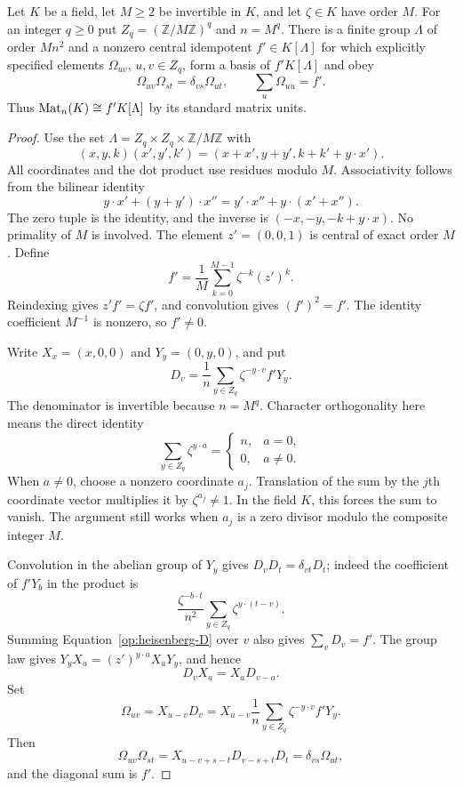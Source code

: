 \begin{proposition}\label{op:heisenberg}
Let $K$ be a field, let $M\ge2$ be invertible in $K$, and let
$\zeta\in K$ have order $M$. For an integer $q\ge0$ put
$Z_q=(\mathbb Z/M\mathbb Z)^q$ and $n=M^q$. There is a finite group
$\Lambda$ of order $Mn^2$ and a nonzero central idempotent
$f'\in K[\Lambda]$ for which explicitly specified elements
$\Omega_{uv}$, $u,v\in Z_q$, form a basis of $f'K[\Lambda]$ and obey
\[
 \Omega_{uv}\Omega_{st}=\delta_{vs}\Omega_{ut},\qquad
 \sum_u\Omega_{uu}=f'.
\]
Thus $\operatorname{Mat}_n(K)\cong f'K[\Lambda]$ by its standard matrix units.
\end{proposition}
\begin{proof}
Use the set $\Lambda=Z_q\times Z_q\times\mathbb Z/M\mathbb Z$ with
\begin{equation}\label{op:heisenberg-law}
 (x,y,k)(x',y',k')=(x+x',y+y',k+k'+y\cdot x').
\end{equation}
All coordinates and the dot product use residues modulo $M$.
Associativity follows from the bilinear identity
\[
 y\cdot x'+(y+y')\cdot x''=y'\cdot x''+y\cdot(x'+x'').
\]
The zero tuple is the identity, and the inverse is
$(-x,-y,-k+y\cdot x)$. No primality of $M$ is involved.
The element $z'=(0,0,1)$ is central of exact order $M$. Define
\[
 f'=\frac1M\sum_{k=0}^{M-1}\zeta^{-k}(z')^k.
\]
Reindexing gives $z'f'=\zeta f'$, and convolution gives $(f')^2=f'$.
The identity coefficient $M^{-1}$ is nonzero, so $f'\ne0$.

Write $X_x=(x,0,0)$ and $Y_y=(0,y,0)$, and put
\begin{equation}\label{op:heisenberg-D}
 D_v=\frac1n\sum_{y\in Z_q}\zeta^{-y\cdot v}f'Y_y.
\end{equation}
The denominator is invertible because $n=M^q$. Character orthogonality
here means the direct identity
\begin{equation}\label{op:composite-orthogonality}
 \sum_{y\in Z_q}\zeta^{y\cdot a}
 =\begin{cases}n,&a=0,\\0,&a\ne0.\end{cases}
\end{equation}
When $a\ne0$, choose a nonzero coordinate $a_j$. Translation of the
sum by the $j$th coordinate vector multiplies it by
$\zeta^{a_j}\ne1$. In the field $K$, this forces the sum to vanish.
The argument still works when $a_j$ is a zero divisor modulo the
composite integer $M$.

Convolution in the abelian group of $Y_y$ gives
$D_vD_t=\delta_{vt}D_t$; indeed the coefficient of $f'Y_b$ in the
product is
\[
 \frac{\zeta^{-b\cdot t}}{n^2}
       \sum_{y\in Z_q}\zeta^{y\cdot(t-v)}.
\]
Summing Equation~\eqref{op:heisenberg-D} over $v$ also gives
$\sum_vD_v=f'$. The group law gives
$Y_yX_a=(z')^{y\cdot a}X_aY_y$, and hence
\[
 D_vX_a=X_aD_{v-a}.
\]
Set
\begin{equation}\label{op:matrix-units}
 \Omega_{uv}=X_{u-v}D_v
 =X_{u-v}\frac1n\sum_{y\in Z_q}\zeta^{-y\cdot v}f'Y_y.
\end{equation}
Then
\[
 \Omega_{uv}\Omega_{st}
 =X_{u-v+s-t}D_{v-s+t}D_t
 =\delta_{vs}\Omega_{ut},
\]
and the diagonal sum is $f'$.


\end{proof}
